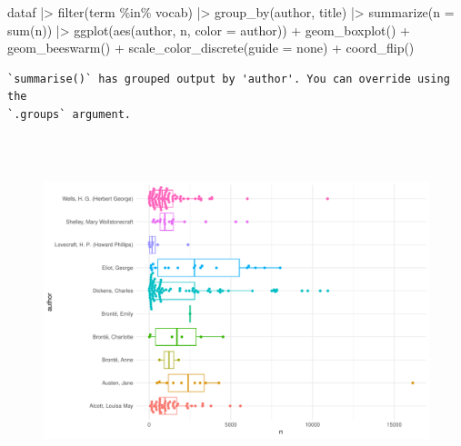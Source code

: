 \documentclass[
]{article}
\newenvironment{Shaded}{\begin{snugshade}}{\end{snugshade}}
\newcommand{\AttributeTok}[1]{\textcolor[rgb]{0.40,0.45,0.13}{#1}}
\newcommand{\FunctionTok}[1]{\textcolor[rgb]{0.28,0.35,0.67}{#1}}
\newcommand{\NormalTok}[1]{\textcolor[rgb]{0.00,0.23,0.31}{#1}}
\newcommand{\SpecialCharTok}[1]{\textcolor[rgb]{0.37,0.37,0.37}{#1}}
\newcommand{\StringTok}[1]{\textcolor[rgb]{0.13,0.47,0.30}{#1}}
\begin{document}
\begin{Shaded}
\begin{Highlighting}[]
\NormalTok{dataf }\SpecialCharTok{|\textgreater{}} 
    \FunctionTok{filter}\NormalTok{(term }\SpecialCharTok{\%in\%}\NormalTok{ vocab) }\SpecialCharTok{|\textgreater{}} 
    \FunctionTok{group\_by}\NormalTok{(author, title) }\SpecialCharTok{|\textgreater{}} 
    \FunctionTok{summarize}\NormalTok{(}\AttributeTok{n =} \FunctionTok{sum}\NormalTok{(n)) }\SpecialCharTok{|\textgreater{}} 
    \FunctionTok{ggplot}\NormalTok{(}\FunctionTok{aes}\NormalTok{(author, n, }\AttributeTok{color =}\NormalTok{ author)) }\SpecialCharTok{+}
    \FunctionTok{geom\_boxplot}\NormalTok{() }\SpecialCharTok{+}
    \FunctionTok{geom\_beeswarm}\NormalTok{() }\SpecialCharTok{+}
    \FunctionTok{scale\_color\_discrete}\NormalTok{(}\AttributeTok{guide =} \StringTok{\textquotesingle{}none\textquotesingle{}}\NormalTok{) }\SpecialCharTok{+}
    \FunctionTok{coord\_flip}\NormalTok{()}
\end{Highlighting}
\end{Shaded}

\begin{verbatim}
`summarise()` has grouped output by 'author'. You can override using the
`.groups` argument.
\end{verbatim}

\begin{figure}[H]

{\centering \includegraphics[width=6in,height=4in]{paper_files/figure-pdf/unnamed-chunk-46-1.pdf}

}

\end{figure}
\end{document}
